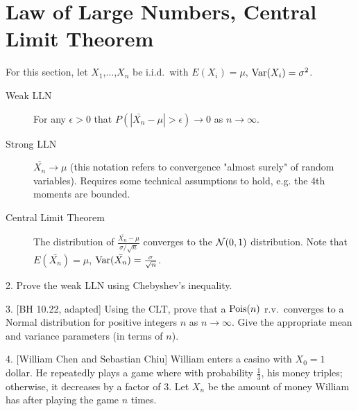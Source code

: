 \documentclass{article}
\begin{document}
\section{Law of Large Numbers, Central Limit Theorem}
For this section, let $X_1$,...,$X_n$ be i.i.d.~with $E(X_i) = \mu$, $\textrm{Var}(X_i) = \sigma^2$.
\begin{description}
\item[Weak LLN] For any $\epsilon>0$ that $P(|\bar{X_n}-\mu| > \epsilon) \rightarrow 0$ as $n \rightarrow \infty$. 

\item[Strong LLN] $\bar{X_n} \rightarrow \mu$ (this notation refers to convergence "almost surely" of random variables). Requires some technical assumptions to hold, e.g. the 4th moments are bounded.

\item[Central Limit Theorem] The distribution of $\frac{\bar{X_n}-\mu}{\sigma/\sqrt{n}}$ converges to the $\mathcal{N}(0,1)$ distribution. Note that $E(\bar{X_n}) = \mu$, $\textrm{Var}(\bar{X_n}) = \frac{\sigma}{\sqrt{n}}$. 

\end{description}

2. Prove the weak LLN using Chebyshev's inequality.


3. [BH 10.22, adapted] Using the CLT, prove that a $\textrm{Pois}(n)$ r.v.~converges to a Normal distribution for positive integers $n$ as $n \rightarrow \infty$. Give the appropriate mean and variance parameters (in terms of $n$). 


4. [William Chen and Sebastian Chiu] William enters a casino with $X_0=1$ dollar. He repeatedly plays a game where with probability $\frac{1}{3}$, his money triples; otherwise, it decreases by a factor of $3$. Let $X_n$ be the amount of money William has after playing the game $n$ times. 
\end{document}
